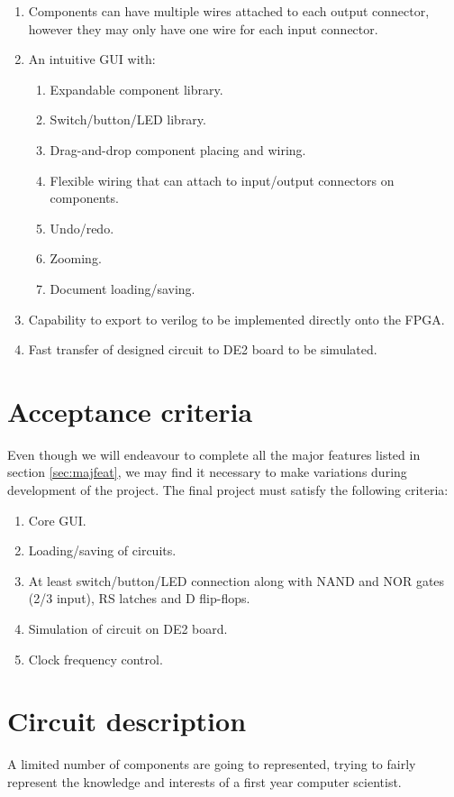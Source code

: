 \documentclass[12pt, a4paper, oneside,titlepage]{article}
\begin{document}
\begin{enumerate}
\item Components can have multiple wires attached to each output connector, however they may only have one wire for each input connector.  
\item An intuitive GUI with:  \begin{enumerate}
						\item Expandable component library.
						\item Switch/button/LED library. 
						\item Drag-and-drop component placing and wiring.
					    \item Flexible wiring that can attach to input/output connectors on components.
					    \item Undo/redo.
					    	\item Zooming.
						\item Document loading/saving.
						\end{enumerate}
\item Capability to export to verilog to be implemented directly onto the FPGA.
\item Fast transfer of designed circuit to DE2 board to be simulated.
\end{enumerate}

\section{Acceptance criteria}
Even though we will endeavour to complete all the major features listed in section \ref{sec:majfeat}, we may find it necessary to make variations during development of the project. The final project must satisfy the following criteria:
\begin{enumerate}
\item Core GUI.
\item Loading/saving of circuits.
\item At least switch/button/LED connection along with NAND and NOR gates (2/3 input), RS latches and D flip-flops.
\item Simulation of circuit on DE2 board.
\item Clock frequency control.
\end{enumerate}

\section{Circuit description}
A limited number of components are going to represented, trying to fairly represent the knowledge and interests of a first year computer scientist. 
\end{document}
